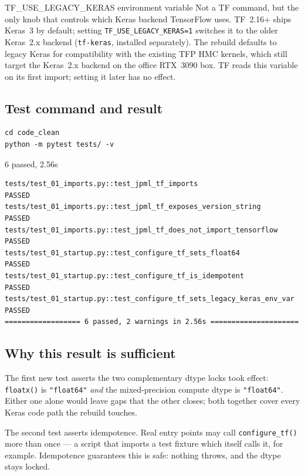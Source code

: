 \documentclass[11pt]{report}
\begin{document}
\begin{tfcmd}{TF\_USE\_LEGACY\_KERAS environment variable}
Not a TF command, but the only knob that controls which Keras backend
TensorFlow uses. TF~2.16+ ships Keras~3 by default; setting
\texttt{TF\_USE\_LEGACY\_KERAS=1} switches it to the older Keras~2.x
backend (\texttt{tf-keras}, installed separately). The rebuild defaults
to legacy Keras for compatibility with the existing TFP HMC kernels,
which still target the Keras~2.x backend on the office RTX~3090 box.
TF reads this variable on its first import; setting it later has no
effect.
\end{tfcmd}

\subsection*{Test command and result}

\begin{lstlisting}[style=shell]
cd code_clean
python -m pytest tests/ -v
\end{lstlisting}

\begin{testresult}{6 passed, 2.56s}
\begin{lstlisting}[style=shell]
tests/test_01_imports.py::test_jpml_tf_imports                       PASSED
tests/test_01_imports.py::test_jpml_tf_exposes_version_string        PASSED
tests/test_01_imports.py::test_jpml_tf_does_not_import_tensorflow    PASSED
tests/test_01_startup.py::test_configure_tf_sets_float64             PASSED
tests/test_01_startup.py::test_configure_tf_is_idempotent            PASSED
tests/test_01_startup.py::test_configure_tf_sets_legacy_keras_env_var PASSED
================== 6 passed, 2 warnings in 2.56s =====================
\end{lstlisting}
\end{testresult}

\subsection*{Why this result is sufficient}

The first new test asserts the two complementary dtype locks took
effect: \texttt{floatx()} is \texttt{"float64"} \emph{and} the
mixed-precision compute dtype is \texttt{"float64"}. Either one alone
would leave gaps that the other closes; both together cover every
Keras code path the rebuild touches.

The second test asserts idempotence. Real entry points may call
\texttt{configure\_tf()} more than once --- a script that imports a
test fixture which itself calls it, for example. Idempotence guarantees
this is safe: nothing throws, and the dtype stays locked.
\end{document}
